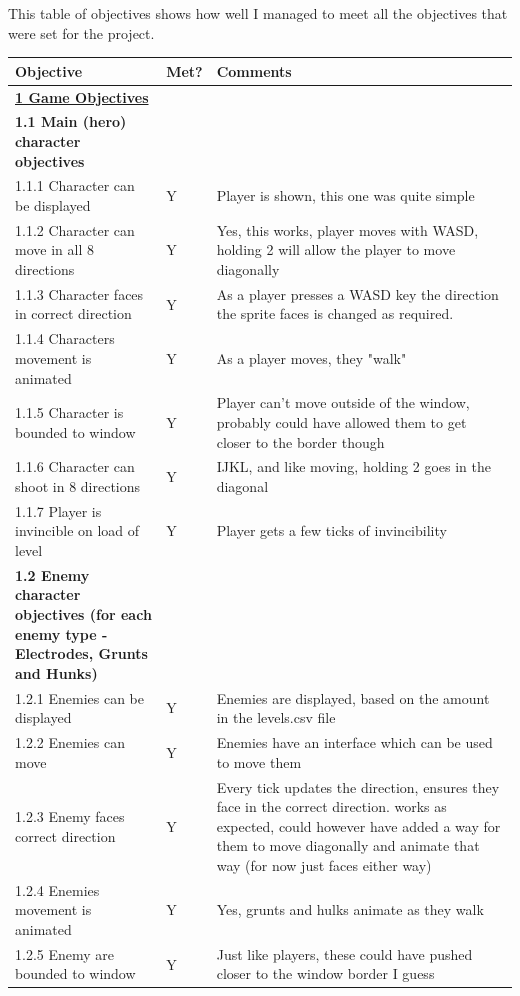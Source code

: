 This table of objectives shows how well I managed to meet all the objectives that were set for the project.
\begin{longtable}{|p{0.3\linewidth}|p{0.1\linewidth}|p{0.6\linewidth}|}
\hline
\rowcolor[HTML]{C0C0C0} 
Objective & Met? & Comments \\ \hline
\endhead
%
{\ul \textbf{1 Game Objectives}} &  &  \\ \hline
\textbf{1.1 Main (hero) character objectives} &  &  \\ \hline
1.1.1 Character can be displayed & Y & Player is shown, this one was quite simple \\ \hline
1.1.2 Character can move in all 8 directions & Y & Yes, this works, player moves with WASD, holding 2 will allow the player to move diagonally \\ \hline
1.1.3 Character faces in correct direction & Y & As a player presses a WASD key the direction the sprite faces is changed as required. \\ \hline
1.1.4 Characters movement is animated & Y & As a player moves, they "walk" \\ \hline
1.1.5 Character is bounded to window & Y & Player can't move outside of the window, probably could have allowed them to get closer to the border though \\ \hline
1.1.6 Character can shoot in 8 directions & Y & IJKL, and like moving, holding 2 goes in the diagonal \\ \hline
1.1.7 Player is invincible on load of level & Y & Player gets a few ticks of invincibility \\ \hline
\textbf{1.2 Enemy character objectives (for each enemy type - Electrodes, Grunts and Hunks)} &  &  \\ \hline
1.2.1 Enemies can be displayed & Y & Enemies are displayed, based on the amount in the levels.csv file \\ \hline
1.2.2 Enemies can move & Y & Enemies have an interface which can be used to move them \\ \hline
1.2.3 Enemy faces correct direction & Y & Every tick updates the direction, ensures they face in the correct direction. works as expected, could however have added a way for them to move diagonally and animate that way (for now just faces either way) \\ \hline
1.2.4 Enemies movement is animated & Y & Yes, grunts and hulks animate as they walk \\ \hline
1.2.5 Enemy are bounded to window & Y & Just like players, these could have pushed closer to the window border I guess \\ \hline

\end{longtable}
